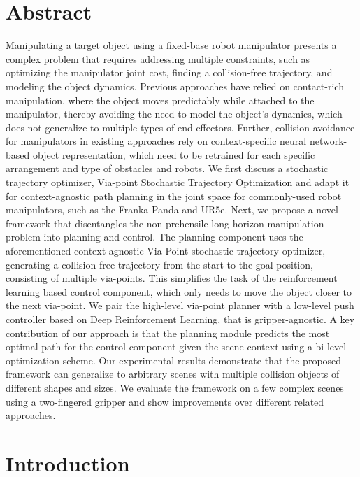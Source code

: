 \section{\label{qleet-sec:abstract}Abstract}

Manipulating a target object using a fixed-base robot manipulator presents a complex problem that requires addressing multiple constraints, such as optimizing the manipulator joint cost, finding a collision-free trajectory, and modeling the object dynamics. Previous approaches have relied on contact-rich manipulation, where the object moves predictably while attached to the manipulator, thereby avoiding the need to model the object's dynamics, which does not generalize to multiple types of end-effectors. Further, collision avoidance for manipulators in existing approaches rely on context-specific neural network-based object representation, which need to be retrained for each specific arrangement and type of obstacles and robots.  
We first discuss a stochastic trajectory optimizer, Via-point Stochastic Trajectory Optimization and adapt it for context-agnostic path planning in the joint space for commonly-used robot manipulators, such as the Franka Panda and UR5e. Next, we propose a novel framework that disentangles the non-prehensile long-horizon manipulation problem into planning and control. The planning component uses the aforementioned context-agnostic Via-Point stochastic trajectory optimizer, generating a collision-free trajectory from the start to the goal position, consisting of multiple via-points. This simplifies the task of the reinforcement learning based control component, which only needs to move the object closer to the next via-point. We pair the high-level via-point planner with a low-level push controller based on Deep Reinforcement Learning, that is gripper-agnostic. A key contribution of our approach is that the planning module predicts the most optimal path for the control component given the scene context using a bi-level optimization scheme. Our experimental results demonstrate that the proposed framework can generalize to arbitrary scenes with multiple collision objects of different shapes and sizes. We evaluate the framework on a few complex scenes using a two-fingered gripper and show improvements over different related approaches.

\section{Introduction}

